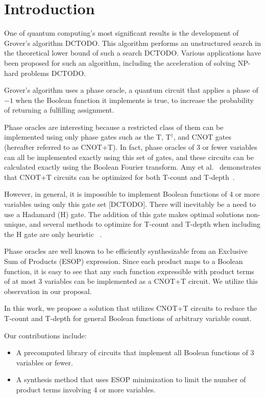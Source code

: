 \section{Introduction}
One of quantum computing's most significant results is the development of Grover's
algorithm DCTODO. This algorithm performs an unstructured search in the theoretical
lower bound of such a search DCTODO. Various applications have been proposed for
such an algorithm, including the acceleration of solving NP-hard problems DCTODO.

Grover's algorithm uses a phase oracle, a quantum circuit that applies a phase of
$-1$ when the Boolean function it implements is true, to increase the probability
of returning a fulfilling assignment.

Phase oracles are interesting because a restricted class of them can be implemented
using only phase gates such as the T, T$^\dagger$, and CNOT gates (hereafter
referred to as CNOT+T). In fact, phase oracles of 3 or fewer variables can all be
implemented exactly using this set of gates, and these circuits can be calculated
exactly using the Boolean Fourier transform. Amy et al.~\cite{amy-meet-in-middle}
demonstrates that CNOT+T circuits can be optimized for both T-count and
T-depth~\cite{bib-amy-matroid}.

However, in general, it is impossible to implement Boolean functions of 4 or more
variables using only this gate set [DCTODO]. There will inevitably be a need to use
a Hadamard (H) gate. The addition of this gate makes optimal solutions non-unique,
and several methods to optimize for T-count and T-depth when including the H gate
are only heuristic ~\cite{amy-meet-in-middle,amy-matroid,bib-amy-rm}.

Phase oracles are well known to be efficiently synthesizable from an Exclusive Sum
of Products (ESOP) expression. Since each product maps to a Boolean function, it
is easy to see that any such function expressible with product terms of at most
3 variables can be implemented as a CNOT+T circuit. We utilize this observation
in our proposal.

In this work, we propose a solution that utilizes CNOT+T circuits to reduce the
T-count and T-depth for general Boolean functions of arbitrary variable count.

Our contributions include:

\begin{itemize}
\item A precomputed library of circuits that implement all Boolean functions of
  3 variables or fewer.
\item A synthesis method that uses ESOP minimization to limit the number of
  product terms involving 4 or more variables.
\end{itemize}

